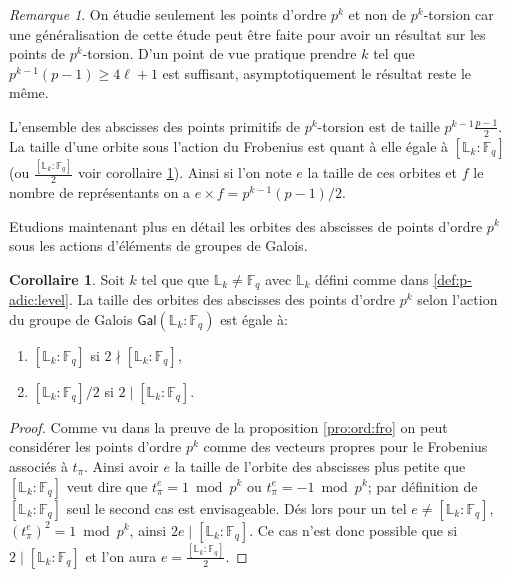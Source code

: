 \documentclass[10pt,a4paper]{book}
\theoremstyle{plain}
\theoremstyle{definition}
\theoremstyle{definition}
\theoremstyle{definition}
\newtheorem{cor}[thm]{Corollaire}
\theoremstyle{definition}
\theoremstyle{definition}
\theoremstyle{remark}
\newtheorem{rem}[thm]{Remarque}
\theoremstyle{remark}
\theoremstyle{definition}
\begin{document}
\begin{rem}
On étudie seulement les points d'ordre $p^k$ et non de $p^k$-torsion car une 
généralisation de cette étude peut être faite pour avoir un résultat sur les 
points de $p^k$-torsion. D'un point de vue pratique prendre $k$ tel que 
$p^{k-1}(p-1) \geqslant 4 \ell +1$ est suffisant, asymptotiquement le résultat 
reste le même.
\end{rem}

L'ensemble des abscisses des points primitifs de $p^k$-torsion est de taille 
$p^{k-1}\frac{p-1}{2}$. La taille d'une orbite sous l'action du Frobenius est 
quant à elle égale à $[\mathbb{L}_k:\mathbb{F}_q]$ (ou 
$\frac{[\mathbb{L}_k:\mathbb{F}_q]}{2}$ voir corollaire \ref{cor:tai:orb}). 
Ainsi si l'on note $e$ la taille de ces orbites et $f$ le nombre de 
représentants on a $e \times f=p^{k-1}(p-1)/2$.

Etudions maintenant plus en détail les orbites des abscisses de points d'ordre $p^k$ sous les actions d'éléments de groupes de Galois.

\begin{cor}
\label{cor:tai:orb}
Soit $k$ tel que que $\mathbb{L}_k \neq \mathbb{F}_q$ avec $\mathbb{L}_k$ 
défini comme dans \ref{def:p-adic:level}. 
La taille des orbites des abscisses des points d'ordre $p^k$ selon l'action du groupe de Galois $\mathsf{Gal}(\mathbb{L}_k:\mathbb{F}_q)$  est égale à:
\begin{enumerate} 
\item $[\mathbb{L}_k:\mathbb{F}_q]$ si $2 \nmid [\mathbb{L}_k:\mathbb{F}_q]$,
\item $[\mathbb{L}_k:\mathbb{F}_q]/2$ si $2 \mid [\mathbb{L}_k:\mathbb{F}_q]$.
\end{enumerate}
\end{cor}

\begin{proof}
Comme vu dans la preuve de la proposition \ref{pro:ord:fro} on peut considérer les points d'ordre $p^k$ comme des vecteurs propres pour le Frobenius associés à $t_{\pi}$. Ainsi avoir $e$ la taille de l'orbite des abscisses plus petite que  $[\mathbb{L}_k:\mathbb{F}_q]$ veut dire que $t_{\pi}^e=1 \bmod p^k$ ou $t_{\pi}^e=-1 \bmod p^k$; par définition de $[\mathbb{L}_k:\mathbb{F}_q]$ seul le second cas est envisageable. Dés lors pour un tel $e \neq [\mathbb{L}_k:\mathbb{F}_q]$,  $(t_{\pi}^{e})^2=1 \bmod p^k$, ainsi $2e \mid [\mathbb{L}_k:\mathbb{F}_q]$. Ce cas n'est donc possible que si $2 \mid [\mathbb{L}_k:\mathbb{F}_q]$ et l'on aura $e= \frac{[\mathbb{L}_k:\mathbb{F}_q]}{2}$. 
\end{proof}
\end{document}
